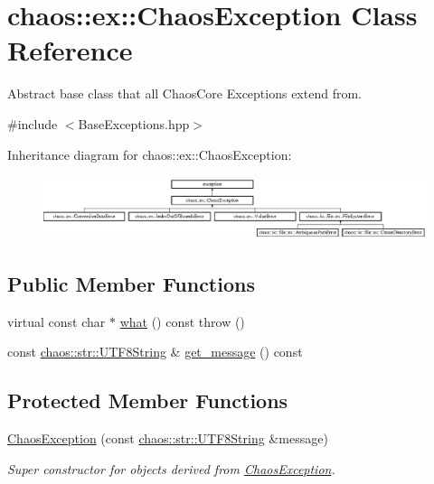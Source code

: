 \hypertarget{classchaos_1_1ex_1_1_chaos_exception}{\section{chaos\-:\-:ex\-:\-:Chaos\-Exception Class Reference}
\label{classchaos_1_1ex_1_1_chaos_exception}
}


Abstract base class that all Chaos\-Core Exceptions extend from.  




{\ttfamily \#include $<$Base\-Exceptions.\-hpp$>$}

Inheritance diagram for chaos\-:\-:ex\-:\-:Chaos\-Exception\-:\begin{figure}[H]
\begin{center}
\leavevmode
\includegraphics[height=1.874477cm]{classchaos_1_1ex_1_1_chaos_exception}
\end{center}
\end{figure}
\subsection*{Public Member Functions}
\begin{DoxyCompactItemize}
\item 
virtual const char $\ast$ \hyperlink{classchaos_1_1ex_1_1_chaos_exception_a5266c5ba1e7b6ab2bbfcb2a6c01fafea}{what} () const   throw ()
\item 
const \hyperlink{classchaos_1_1str_1_1_u_t_f8_string}{chaos\-::str\-::\-U\-T\-F8\-String} \& \hyperlink{classchaos_1_1ex_1_1_chaos_exception_a944fe85435124a77c0b49149e7eadc12}{get\-\_\-message} () const 
\end{DoxyCompactItemize}
\subsection*{Protected Member Functions}
\begin{DoxyCompactItemize}
\item 
\hyperlink{classchaos_1_1ex_1_1_chaos_exception_af0bdefc632dbd0fd039d7af6b2a9e52b}{Chaos\-Exception} (const \hyperlink{classchaos_1_1str_1_1_u_t_f8_string}{chaos\-::str\-::\-U\-T\-F8\-String} \&message)
\begin{DoxyCompactList}\small\item\em Super constructor for objects derived from \hyperlink{classchaos_1_1ex_1_1_chaos_exception}{Chaos\-Exception}. \end{DoxyCompactList}\end{DoxyCompactItemize}


